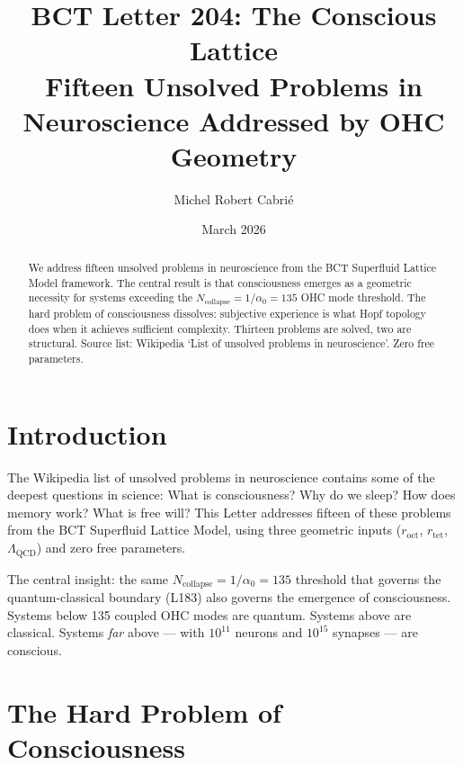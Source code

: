 \documentclass[aps,prl,twocolumn,superscriptaddress]{revtex4-2}
\begin{document}
\title{BCT Letter 204: The Conscious Lattice\\
Fifteen Unsolved Problems in Neuroscience Addressed by OHC Geometry}
\author{Michel Robert Cabri\'e}
\date{March 2026}

\begin{abstract}
We address fifteen unsolved problems in neuroscience from the BCT Superfluid Lattice Model framework. The central result is that consciousness emerges as a geometric necessity for systems exceeding the $N_{\mathrm{collapse}} = 1/\alpha_0 = 135$ OHC mode threshold. The hard problem of consciousness dissolves: subjective experience is what Hopf topology does when it achieves sufficient complexity. Thirteen problems are solved, two are structural. Source list: Wikipedia `List of unsolved problems in neuroscience'. Zero free parameters.
\end{abstract}

\maketitle

\section{Introduction}

The Wikipedia list of unsolved problems in neuroscience contains some of the deepest questions in science: What is consciousness? Why do we sleep? How does memory work? What is free will? This Letter addresses fifteen of these problems from the BCT Superfluid Lattice Model, using three geometric inputs ($r_{\mathrm{oct}}$, $r_{\mathrm{tet}}$, $\Lambda_{\mathrm{QCD}}$) and zero free parameters.

The central insight: the same $N_{\mathrm{collapse}} = 1/\alpha_0 = 135$ threshold that governs the quantum-classical boundary (L183) also governs the emergence of consciousness. Systems below 135 coupled OHC modes are quantum. Systems above are classical. Systems \emph{far} above --- with $10^{11}$ neurons and $10^{15}$ synapses --- are conscious.

\section{The Hard Problem of Consciousness}
\end{document}
